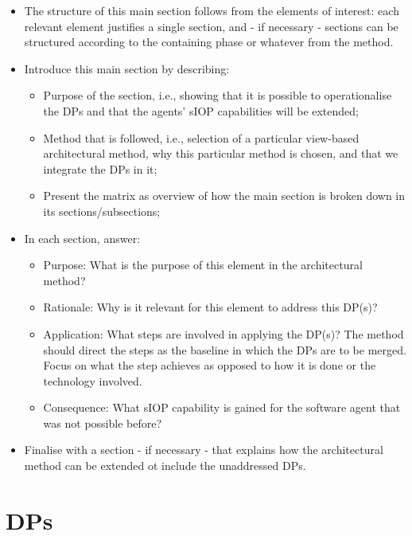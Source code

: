 \documentclass[sort&compress,preprint,3p,authoryear,twocolumn]{elsarticle}
\providecommand{\tightlist}{%
  \setlength{\itemsep}{0pt}\setlength{\parskip}{0pt}}
\theoremstyle{break}			%
\begin{document}
\begin{itemize}
\tightlist
\item
  The structure of this main section follows from the elements of
  interest: each relevant element justifies a single section, and - if
  necessary - sections can be structured according to the containing
  phase or whatever from the method.
\item
  Introduce this main section by describing:

  \begin{itemize}
  \tightlist
  \item
    Purpose of the section, i.e., showing that it is possible to
    operationalise the DPs and that the agents' sIOP capabilities will
    be extended;
  \item
    Method that is followed, i.e., selection of a particular view-based
    architectural method, why this particular method is chosen, and that
    we integrate the DPs in it;
  \item
    Present the matrix as overview of how the main section is broken
    down in its sections/subsections;
  \end{itemize}
\item
  In each section, answer:

  \begin{itemize}
  \tightlist
  \item
    Purpose: What is the purpose of this element in the architectural
    method?
  \item
    Rationale: Why is it relevant for this element to address this
    DP(s)?
  \item
    Application: What steps are involved in applying the DP(s)? The
    method should direct the steps as the baseline in which the DPs are
    to be merged. Focus on what the step achieves as opposed to how it
    is done or the technology involved.
  \item
    Consequence: What sIOP capability is gained for the software agent
    that was not possible before?
  \end{itemize}
\item
  Finalise with a section - if necessary - that explains how the
  architectural method can be extended ot include the unaddressed DPs.
\end{itemize}

\section{DPs}\label{dps}
\end{document}
